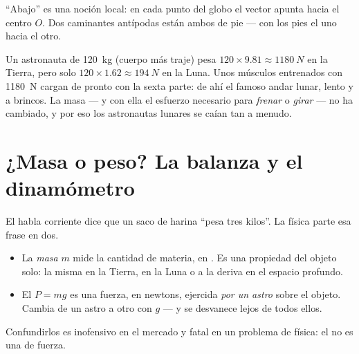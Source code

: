 \begin{omfigure}

{\small ``Abajo'' es una noción local: en cada punto del globo el vector
 apunta hacia el centro $O$. Dos caminantes antípodas están ambos de
pie --- con los pies el uno hacia el otro.}
\end{omfigure}

\begin{remark}\label{rem:g10:universal-gravitation:bounce}
Un astronauta de \qty{120}{kg} (cuerpo más traje) pesa
$120 \times 9.81 \approx \qty{1180}{N}$ en la Tierra, pero solo
$120 \times 1.62 \approx \qty{194}{N}$ en la Luna. Unos músculos
entrenados con \qty{1180}{N} cargan de pronto con la sexta parte: de ahí
el famoso andar lunar, lento y a brincos. La masa --- y con ella el
esfuerzo necesario para \emph{frenar} o \emph{girar} --- no ha
cambiado, y por eso los astronautas lunares se caían tan a menudo.
\end{remark}

\section{¿Masa o peso? La balanza y el dinamómetro}

El habla corriente dice que un saco de harina ``pesa tres kilos''. La
física parte esa frase en dos.

\begin{remark}\label{rem:g10:universal-gravitation:massweight}
\begin{itemize}
  \item La \emph{masa} $m$ mide la cantidad de materia, en .
        Es una propiedad del objeto solo: la misma en la Tierra, en la
        Luna o a la deriva en el espacio profundo.
  \item El \emph{} $P = mg$ es una fuerza, en newtons, ejercida
        \emph{por un astro} sobre el objeto. Cambia de un astro a otro
        con $g$ --- y se desvanece lejos de todos ellos.
\end{itemize}
Confundirlos es inofensivo en el mercado y fatal en un problema de
física: el  no es una  de fuerza.
\end{remark}

